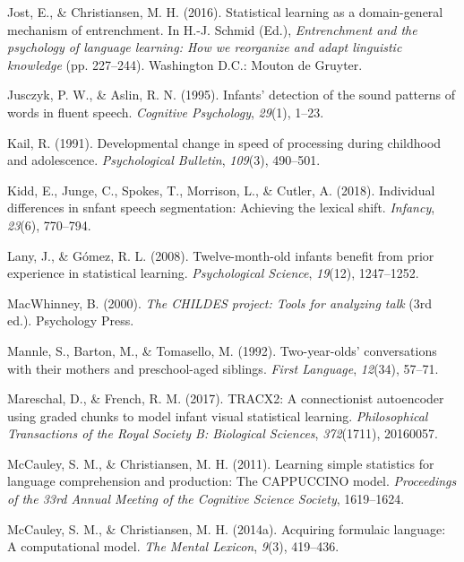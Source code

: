 \documentclass[man,mask,floatsintext]{apa6}
\begin{document}
\hypertarget{ref-jost201610}{}
Jost, E., \& Christiansen, M. H. (2016). Statistical learning as a
domain-general mechanism of entrenchment. In H.-J. Schmid (Ed.),
\emph{Entrenchment and the psychology of language learning: How we
reorganize and adapt linguistic knowledge} (pp. 227--244). Washington
D.C.: Mouton de Gruyter.

\hypertarget{ref-jusczyk1995infants}{}
Jusczyk, P. W., \& Aslin, R. N. (1995). Infants' detection of the sound
patterns of words in fluent speech. \emph{Cognitive Psychology},
\emph{29}(1), 1--23.

\hypertarget{ref-kail1991developmental}{}
Kail, R. (1991). Developmental change in speed of processing during
childhood and adolescence. \emph{Psychological Bulletin}, \emph{109}(3),
490--501.

\hypertarget{ref-kidd2018individual}{}
Kidd, E., Junge, C., Spokes, T., Morrison, L., \& Cutler, A. (2018).
Individual differences in snfant speech segmentation: Achieving the
lexical shift. \emph{Infancy}, \emph{23}(6), 770--794.

\hypertarget{ref-lany2008twelve}{}
Lany, J., \& Gómez, R. L. (2008). Twelve-month-old infants benefit from
prior experience in statistical learning. \emph{Psychological Science},
\emph{19}(12), 1247--1252.

\hypertarget{ref-childes}{}
MacWhinney, B. (2000). \emph{The CHILDES project: Tools for analyzing
talk} (3rd ed.). Psychology Press.

\hypertarget{ref-mannle1992twoyearolds}{}
Mannle, S., Barton, M., \& Tomasello, M. (1992). Two-year-olds'
conversations with their mothers and preschool-aged siblings.
\emph{First Language}, \emph{12}(34), 57--71.

\hypertarget{ref-mareschal2017tracx2}{}
Mareschal, D., \& French, R. M. (2017). TRACX2: A connectionist
autoencoder using graded chunks to model infant visual statistical
learning. \emph{Philosophical Transactions of the Royal Society B:
Biological Sciences}, \emph{372}(1711), 20160057.

\hypertarget{ref-mccauley2011learning}{}
McCauley, S. M., \& Christiansen, M. H. (2011). Learning simple
statistics for language comprehension and production: The CAPPUCCINO
model. \emph{Proceedings of the 33rd Annual Meeting of the Cognitive
Science Society}, 1619--1624.

\hypertarget{ref-mccauley2014acquiring}{}
McCauley, S. M., \& Christiansen, M. H. (2014a). Acquiring formulaic
language: A computational model. \emph{The Mental Lexicon}, \emph{9}(3),
419--436.
\end{document}
